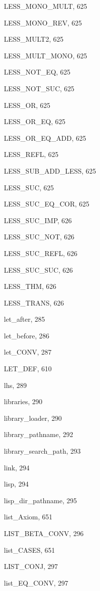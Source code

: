 \begin{theindex}
  \item {\ptt LESS\_MONO\_MULT}, 625
  \item {\ptt LESS\_MONO\_REV}, 625
  \item {\ptt LESS\_MULT2}, 625
  \item {\ptt LESS\_MULT\_MONO}, 625
  \item {\ptt LESS\_NOT\_EQ}, 625
  \item {\ptt LESS\_NOT\_SUC}, 625
  \item {\ptt LESS\_OR}, 625
  \item {\ptt LESS\_OR\_EQ}, 625
  \item {\ptt LESS\_OR\_EQ\_ADD}, 625
  \item {\ptt LESS\_REFL}, 625
  \item {\ptt LESS\_SUB\_ADD\_LESS}, 625
  \item {\ptt LESS\_SUC}, 625
  \item {\ptt LESS\_SUC\_EQ\_COR}, 625
  \item {\ptt LESS\_SUC\_IMP}, 626
  \item {\ptt LESS\_SUC\_NOT}, 626
  \item {\ptt LESS\_SUC\_REFL}, 626
  \item {\ptt LESS\_SUC\_SUC}, 626
  \item {\ptt LESS\_THM}, 626
  \item {\ptt LESS\_TRANS}, 626
  \item {\ptt let\_after}, 285
  \item {\ptt let\_before}, 286
  \item {\ptt let\_CONV}, 287
  \item {\ptt LET\_DEF}, 610
  \item {\ptt lhs}, 289
  \item {\ptt libraries}, 290
  \item {\ptt library\_loader}, 290
  \item {\ptt library\_pathname}, 292
  \item {\ptt library\_search\_path}, 293
  \item {\ptt link}, 294
  \item {\ptt lisp}, 294
  \item {\ptt lisp\_dir\_pathname}, 295
  \item {\ptt list\_Axiom}, 651
  \item {\ptt LIST\_BETA\_CONV}, 296
  \item {\ptt list\_CASES}, 651
  \item {\ptt LIST\_CONJ}, 297
  \item {\ptt list\_EQ\_CONV}, 297

\end{theindex}
